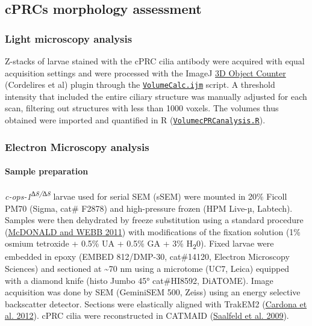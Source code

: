 \documentclass[
]{article}
\begin{document}
\hypertarget{cprcs-morphology-assessment}{%
\subsection{cPRCs morphology
assessment}\label{cprcs-morphology-assessment}}

\hypertarget{light-microscopy-analysis}{%
\subsubsection{Light microscopy
analysis}\label{light-microscopy-analysis}}

Z-stacks of larvae stained with the cPRC cilia antibody were acquired
with equal acquisition settings and were processed with the ImageJ
\href{https://imagej.nih.gov/ij/plugins/track/objects.html}{3D Object
Counter} (Cordelires et al) plugin through the
\href{https://github.com/JekelyLab/Bezares_et_al_2023_Pressure/blob/main/Code/cPRCmorphology/VolumeCalc.ijm}{\texttt{VolumeCalc.ijm}}
script. A threshold intensity that included the entire ciliary structure
was manually adjusted for each scan, filtering out structures with less
than 1000 voxels. The volumes thus obtained were imported and quantified
in R
(\href{https://github.com/JekelyLab/Bezares_et_al_2023_Pressure/blob/main/Code/cPRCmorphology/VolumecPRCanalysis.R}{\texttt{VolumecPRCanalysis.R}}).

\hypertarget{electron-microscopy-analysis}{%
\subsubsection{Electron Microscopy
analysis}\label{electron-microscopy-analysis}}

\hypertarget{sample-preparation}{%
\paragraph{Sample preparation}\label{sample-preparation}}

\emph{c-ops-1\textsuperscript{∆8/∆8}} larvae used for serial SEM (sSEM)
were mounted in 20\% Ficoll PM70 (Sigma, cat\# F2878) and high-pressure
frozen (HPM Live-µ, Labtech). Samples were then dehydrated by freeze
substitution using a standard procedure
(\protect\hyperlink{ref-mcdonald2011}{McDONALD and WEBB 2011}) with
modifications of the fixation solution (1\% osmium tetroxide + 0.5\% UA
+ 0.5\% GA + 3\% H\textsubscript{2}0). Fixed larvae were embedded in
epoxy (EMBED 812/DMP-30, cat\#14120, Electron Microscopy Sciences) and
sectioned at \textasciitilde70 nm using a microtome (UC7, Leica)
equipped with a diamond knife (histo Jumbo 45° cat\#HI8592, DiATOME).
Image acquisition was done by SEM (GeminiSEM 500, Zeiss) using an energy
selective backscatter detector. Sections were elastically aligned with
TrakEM2 (\protect\hyperlink{ref-cardona2012}{Cardona et al. 2012}). cPRC
cilia were reconstructed in CATMAID
(\protect\hyperlink{ref-saalfeld2009}{Saalfeld et al. 2009}).
\end{document}
